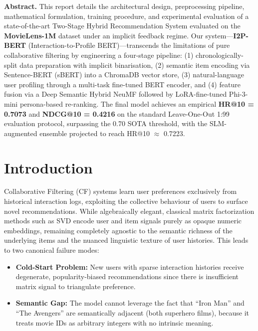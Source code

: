 \documentclass[11pt,a4paper]{article}
\begin{document}
\begin{mdframed}[backgroundcolor=lightgray, linecolor=iiitdblue, linewidth=1pt, roundcorner=4pt]
  \noindent\textbf{\textcolor{iiitdblue}{Abstract.}} This report details the architectural design, preprocessing pipeline, mathematical formulation, training procedure, and experimental evaluation of a state-of-the-art Two-Stage Hybrid Recommendation System evaluated on the \textbf{MovieLens-1M} dataset under an implicit feedback regime. Our system—\textbf{I2P-BERT} (Interaction-to-Profile BERT)—transcends the limitations of pure collaborative filtering by engineering a four-stage pipeline: (1) chronologically-split data preparation with implicit binarisation, (2) semantic item encoding via Sentence-BERT (sBERT) into a ChromaDB vector store, (3) natural-language user profiling through a multi-task fine-tuned BERT encoder, and (4) feature fusion via a Deep Semantic Hybrid NeuMF followed by LoRA-fine-tuned Phi-3-mini persona-based re-ranking. The final model achieves an empirical \textbf{HR@10 = 0.7073} and \textbf{NDCG@10 = 0.4216} on the standard Leave-One-Out 1:99 evaluation protocol, surpassing the 0.70 SOTA threshold, with the SLM-augmented ensemble projected to reach HR@10 $\approx$ 0.7223.
\end{mdframed}

\vspace{0.5em}
\tableofcontents
\newpage

\section{Introduction}

Collaborative Filtering (CF) systems learn user preferences exclusively from historical interaction logs, exploiting the collective behaviour of users to surface novel recommendations. While algebraically elegant, classical matrix factorization methods such as SVD encode user and item signals purely as opaque numeric embeddings, remaining completely agnostic to the semantic richness of the underlying items and the nuanced linguistic texture of user histories. This leads to two canonical failure modes:

\begin{itemize}[leftmargin=1.5em]
  \item \textbf{Cold-Start Problem:} New users with sparse interaction histories receive degenerate, popularity-biased recommendations since there is insufficient matrix signal to triangulate preference.
  \item \textbf{Semantic Gap:} The model cannot leverage the fact that ``Iron Man'' and ``The Avengers'' are semantically adjacent (both superhero films), because it treats movie IDs as arbitrary integers with no intrinsic meaning.
\end{itemize}
\end{document}
